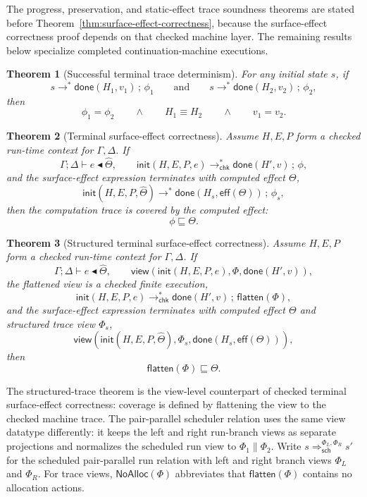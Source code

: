 \documentclass[10pt,a4paper]{article}
\newcommand{\desc}{\mathrel{\blacktriangleleft}}      %
\newcommand{\approxx}{\mathrel{\sqsubseteq}}          %
\newcommand{\thetahat}{\widehat{\Theta}}
\newcommand{\NoAlloc}{\mathsf{NoAlloc}}
\newcommand{\chksteps}{\mathrel{\longrightarrow^{*}_{\mathsf{chk}}}}
\newtheorem{theorem}{Theorem}
\begin{document}
\noindent The progress, preservation, and static-effect trace
soundness theorems are stated before
Theorem~\ref{thm:surface-effect-correctness}, because the surface-effect
correctness proof depends on that checked machine layer. The remaining results
below specialize completed continuation-machine executions.

\begin{theorem}[Successful terminal trace determinism]
For any initial state $s$, if
\[
s\longrightarrow^{*}\mathsf{done}(H_1,v_1)\,;\,\phi_1
\qquad\text{and}\qquad
s\longrightarrow^{*}\mathsf{done}(H_2,v_2)\,;\,\phi_2,
\]
then
\[
\phi_1=\phi_2
\qquad\land\qquad
H_1\equiv H_2
\qquad\land\qquad
v_1=v_2.
\]
\end{theorem}

\begin{theorem}[Terminal surface-effect correctness]
Assume $H,E,P$ form a checked run-time context for $\Gamma,\Delta$. If
\[
\Gamma;\Delta\vdash e\desc \thetahat,
\qquad
\mathsf{init}(H,E,P,e)
  \chksteps
  \mathsf{done}(H',v)\,;\,\phi,
\]
and the surface-effect expression terminates with computed effect $\Theta$,
\[
\mathsf{init}(H,E,P,\thetahat)
  \longrightarrow^{*}
  \mathsf{done}(H_s,\mathsf{eff}(\Theta))\,;\,\phi_s,
\]
then the computation trace is covered by the computed effect:
\[
\phi\approxx\Theta.
\]
\end{theorem}

\begin{theorem}[Structured terminal surface-effect correctness]
Assume $H,E,P$ form a checked run-time context for $\Gamma,\Delta$. If
\[
\Gamma;\Delta\vdash e\desc \thetahat,
\qquad
\mathsf{view}(
  \mathsf{init}(H,E,P,e),
  \Phi,
  \mathsf{done}(H',v)),
\]
the flattened view is a checked finite execution,
\[
\mathsf{init}(H,E,P,e)
  \chksteps
  \mathsf{done}(H',v)\,;\,\mathsf{flatten}(\Phi),
\]
and the surface-effect expression terminates with computed effect $\Theta$ and
structured trace view $\Phi_s$,
\[
\mathsf{view}(
  \mathsf{init}(H,E,P,\thetahat),
  \Phi_s,
  \mathsf{done}(H_s,\mathsf{eff}(\Theta))),
\]
then
\[
\mathsf{flatten}(\Phi)\approxx\Theta.
\]
\end{theorem}

The structured-trace theorem is the view-level counterpart of checked terminal
surface-effect correctness: coverage is defined by flattening the view to the
checked machine trace. The pair-parallel scheduler relation uses the same view
datatype differently: it keeps the left and right run-branch views as separate
projections and normalizes the scheduled run view to
$\Phi_1\parallel\Phi_2$. Write
$s\Longrightarrow_{\mathsf{sch}}^{\Phi_L,\Phi_R}s'$ for the scheduled
pair-parallel run relation with left and right branch views $\Phi_L$ and
$\Phi_R$. For trace views, $\NoAlloc(\Phi)$ abbreviates that
$\mathsf{flatten}(\Phi)$ contains no allocation actions.
\end{document}

